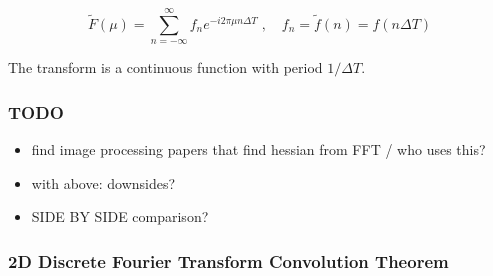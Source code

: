 	
	\begin{equation} \label{1D-DFT-transform}
	\tilde{F}(\mu) = \sum_{n=-\infty}^{\infty} f_n e^{-i 2\pi \mu n \Delta T} \;,\quad
		f_n = \tilde{f}(n) = f(n\Delta T)
	\end{equation}
	
	The transform is a continuous function with period $1 / \Delta T$. 
	
		\subsubsection{TODO}
		\begin{itemize}
			\item find image processing papers that find hessian from FFT / who uses this?
			\item with above: downsides?
			\item SIDE BY SIDE comparison?
		\end{itemize}
		
		\subsubsection{2D Discrete Fourier Transform Convolution Theorem}
		
